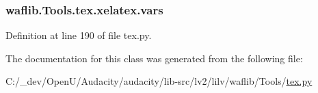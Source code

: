 \subsubsection[{\texorpdfstring{vars}{vars}}]{\setlength{\rightskip}{0pt plus 5cm}waflib.\+Tools.\+tex.\+xelatex.\+vars\hspace{0.3cm}{\ttfamily [static]}}\hypertarget{classwaflib_1_1_tools_1_1tex_1_1xelatex_a3533f624f2e10935e419d0ea244d9485}{}\label{classwaflib_1_1_tools_1_1tex_1_1xelatex_a3533f624f2e10935e419d0ea244d9485}


Definition at line 190 of file tex.\+py.



The documentation for this class was generated from the following file\+:\begin{DoxyCompactItemize}
\item 
C\+:/\+\_\+dev/\+Open\+U/\+Audacity/audacity/lib-\/src/lv2/lilv/waflib/\+Tools/\hyperlink{lilv_2waflib_2_tools_2tex_8py}{tex.\+py}\end{DoxyCompactItemize}
